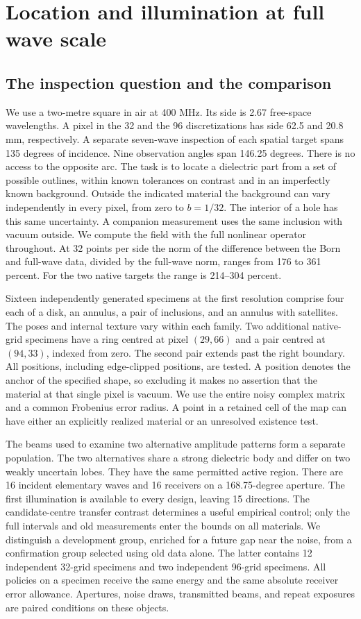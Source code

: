 \section{Location and illumination at full wave scale}\label{sec:exp}
\subsection{The inspection question and the comparison}
We use a two-metre square in air at 400 MHz. Its side is 2.67 free-space wavelengths. A pixel in the 32 and the 96 discretizations has side 62.5 and 20.8 mm, respectively. A separate seven-wave inspection of each spatial target spans 135 degrees of incidence. Nine observation angles span 146.25 degrees. There is no access to the opposite arc. The task is to locate a dielectric part from a set of possible outlines, within known tolerances on contrast and in an imperfectly known background. Outside the indicated material the background can vary independently in every pixel, from zero to $b=1/32$. The interior of a hole has this same uncertainty. A companion measurement uses the same inclusion with vacuum outside. We compute the field with the full nonlinear operator throughout. At 32 points per side the norm of the difference between the Born and full-wave data, divided by the full-wave norm, ranges from 176 to 361 percent. For the two native targets the range is 214--304 percent.

Sixteen independently generated specimens at the first resolution comprise four each of a disk, an annulus, a pair of inclusions, and an annulus with satellites. The poses and internal texture vary within each family. Two additional native-grid specimens have a ring centred at pixel $(29,66)$ and a pair centred at $(94,33)$, indexed from zero. The second pair extends past the right boundary. All positions, including edge-clipped positions, are tested. A position denotes the anchor of the specified shape, so excluding it makes no assertion that the material at that single pixel is vacuum. We use the entire noisy complex matrix and a common Frobenius error radius. A point in a retained cell of the map can have either an explicitly realized material or an unresolved existence test.

The beams used to examine two alternative amplitude patterns form a separate population. The two alternatives share a strong dielectric body and differ on two weakly uncertain lobes. They have the same permitted active region. There are 16 incident elementary waves and 16 receivers on a 168.75-degree aperture. The first illumination is available to every design, leaving 15 directions. The candidate-centre transfer contrast determines a useful empirical control; only the full intervals and old measurements enter the bounds on all materials. We distinguish a development group, enriched for a future gap near the noise, from a confirmation group selected using old data alone. The latter contains 12 independent 32-grid specimens and two independent 96-grid specimens. All policies on a specimen receive the same energy and the same absolute receiver error allowance. Apertures, noise draws, transmitted beams, and repeat exposures are paired conditions on these objects.

